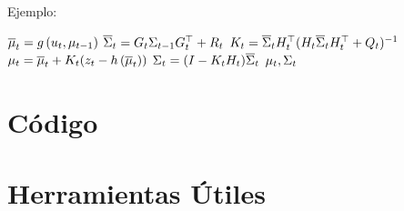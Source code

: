 \documentclass[a4paper,	11pt]{article}
\begin{document}
Ejemplo:
    \begin{algorithmic}[1]
        \State $\overline{\mu}_{t} = g\left( u_{t}, \mu_{t-1} \right)$
        \State $\overline{\Sigma}_{t} = G_{t} \Sigma_{t-1} G_{t}^{\top}+R_{t}$
        \Statex
        \State $K_{t} = \overline{\Sigma}_{t} H_{t}^{\top} (H_{t} \overline{\Sigma}_{t}  H_{t}^{\top} + Q_{t})^{-1} $
        \State $\mu_{t} = \overline{\mu}_{t} + K_{t} (z_{t} - h\left( \overline{\mu}_{t} \right))$
        \State $\Sigma_{t} =  (I - K_{t} H_{t}) \overline{\Sigma}_{t}$
        \State \Return $\mu_{t}, \Sigma_{t}$
    \EndProcedure
    \end{algorithmic}

\section{Código}

\section{Herramientas Útiles}
\end{document}
